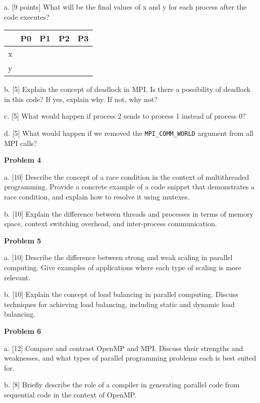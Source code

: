 \documentclass{article}
\begin{document}
a. [9 points] What will be the final values of x and y for each process after the code executes?

\begin{tabular}{|c|c|c|c|c|}
\hline
 & P0 & P1 & P2 & P3 \\ \hline
x &  &  &  &  \\ \hline
y &  &  &  &  \\ \hline
\end{tabular}

b. [5]  Explain the concept of deadlock in MPI. Is there a possibility of deadlock in this code? If yes, explain why. If not, why not?


c. [5] What would happen if process 2 sends to process 1 instead of process 0?


d. [5] What would happen if we removed the \texttt{MPI\_COMM\_WORLD} argument from all MPI calls?



\vspace{1cm}

\textbf{Problem 4}

a. [10] Describe the concept of a race condition in the context of multithreaded programming. Provide a concrete example of a code snippet that demonstrates a race condition, and explain how to resolve it using mutexes.

b. [10] Explain the difference between threads and processes in terms of memory space, context switching overhead, and inter-process communication.

\vspace{1cm}

\textbf{Problem 5}

a. [10]  Describe the difference between strong and weak scaling in parallel computing. Give examples of applications where each type of scaling is more relevant.

b. [10] Explain the concept of load balancing in parallel computing.  Discuss techniques for achieving load balancing, including static and dynamic load balancing.

\vspace{1cm}

\textbf{Problem 6}

a. [12]  Compare and contrast OpenMP and MPI.  Discuss their strengths and weaknesses, and what types of parallel programming problems each is best suited for.

b. [8] Briefly describe the role of a compiler in generating parallel code from sequential code in the context of OpenMP.
\end{document}
